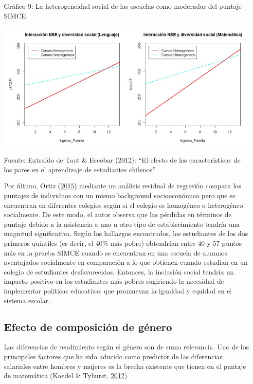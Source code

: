 \documentclass[
]{article}
\begin{document}
Gráfico 9: La heterogeneidad social de las escuelas como moderador del
puntaje SIMCE

\includegraphics{input/images/heterogeneidad_social_moderador.jpg}

Fuente: Extraído de Taut \& Escobar (2012): ``El efecto de las
características de los pares en el aprendizaje de estudiantes chilenos''

Por último, Ortiz (\protect\hyperlink{ref-ortiz_escuelas_2015}{2015})
mediante un análisis residual de regresión compara los puntajes de
individuos con un mismo background socioeconómico pero que se encuentran
en diferentes colegios según si el colegio es homogéneo o heterogéneo
socialmente. De este modo, el autor observa que las pérdidas en términos
de puntaje debido a la asistencia a uno u otro tipo de establecimiento
tendría una magnitud significativa. Según los hallazgos encontrados, los
estudiantes de los dos primeros quintiles (es decir, el 40\% más pobre)
obtendrían entre 40 y 57 puntos más en la prueba SIMCE cuando se
encuentran en una escuela de alumnos aventajados socialmente en
comparación a lo que obtienen cuando estudian en un colegio de
estudiantes desfavorecidos. Entonces, la inclusión social tendría un
impacto positivo en los estudiantes más pobres sugiriendo la necesidad
de implementar políticas educativas que promuevan la igualdad y equidad
en el sistema escolar.

\hypertarget{efecto-de-composiciuxf3n-de-guxe9nero}{%
\subsection{Efecto de composición de
género}\label{efecto-de-composiciuxf3n-de-guxe9nero}}

Las diferencias de rendimiento según el género son de suma relevancia.
Uno de los principales factores que ha sido aducido como predictor de
las diferencias salariales entre hombres y mujeres es la brecha
existente que tienen en el puntaje de matemática (Koedel \& Tyhurst,
\protect\hyperlink{ref-koedel_math_2012}{2012}).
\end{document}
